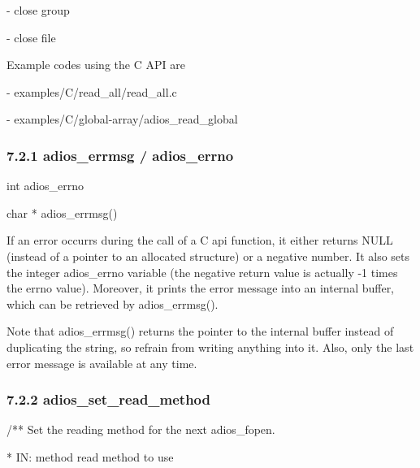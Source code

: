 \vspace{10pt}
- close group

\vspace{10pt}
- close file

\vspace{10pt}
Example codes using the C API are 

\vspace{10pt}
\leftskip=36pt
- examples/C/read\_all/read\_all.c

\vspace{10pt}
- examples/C/global-array/adios\_read\_global\label{HToc182553399}

\vspace{10pt}
\subsubsection*{{\large \textbf{7.2.1 adios\_errmsg / adios\_errno}}}

\vspace{10pt}
\leftskip=0pt
int    adios\_errno

\vspace{10pt}
char * adios\_errmsg()

\vspace{22pt}
If an error occurrs during the call of a C api function, it either returns NULL 
(instead of a pointer to an allocated structure) or a negative number. It also 
sets the integer adios\_errno variable (the negative return value is actually -1 
times the errno value). Moreover, it prints the error message into an internal 
buffer, which can be retrieved by adios\_errmsg(). 

\vspace{10pt}
Note that adios\_errmsg() returns the pointer to the internal buffer instead of 
duplicating the string, so refrain from writing anything into it. Also, only the 
last error message is available at any time.\label{HToc182553400}

\vspace{10pt}
\subsubsection*{{\large \textbf{7.2.2 adios\_set\_read\_method}}}

\vspace{10pt}
/** Set the reading method for the next adios\_fopen.

\vspace{10pt}
\parindent=3pt
*  IN:  method   read method to use

